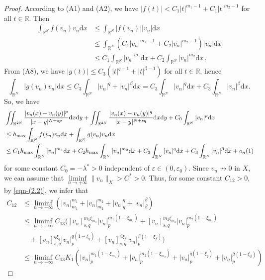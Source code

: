 \documentclass[reqno]{amsart}
\begin{document}
\begin{proof}
According to (A1) and (A2), we have 
$|f(t)|<C_1|t|^{m_1-1}+C_1|t|^{m_2-1}$ for all $t\in\mathbb{R}$. Then
\begin{align*}
\int_{\mathbb{R}^N}f(v_n)v_n\mathrm{d}x
&\le \int_{\mathbb{R}^N}|f(v_n)||v_n|\mathrm{d}x\\
&\le\int_{\mathbb{R}^N}(C_1|v_n|^{m_1-1}+C_2|v_n|^{m_2-1})|v_n|\mathrm{d}x\\
&\le C_1\int_{\mathbb{R}^N}|v_n|^{m_1}\mathrm{d}x
+C_2\int_{\mathbb{R}^N}|v_n|^{m_2}\mathrm{d}x\,.
\end{align*}
From (A8), we have $|g(t)|\le C_3(|t|^{q-1}+|t|^{\beta-1})$ for all $t\in\mathbb{R} $, 
hence
$$
\int_{\mathbb{R}^N}|g(v_n)v_n|\mathrm{d}x
 \le C_3\int_{\mathbb{R}^N}|v_n|^{q}+|v_n|^{\beta}\mathrm{d}x
 =C_3\int_{\mathbb{R}^N}|v_n|^{q}\mathrm{d}x
 +C_3\int_{\mathbb{R}^N}|v_n|^{\beta}\mathrm{d}x.
$$
So, we have
\begin{align*}
&\iint_{\mathbb{R}^{2N}}\frac{|v_n(x)-v_n(y)|^{p}}{|x-y|^{N+sp}}
 \mathrm{d}x\mathrm{d}y+\iint_{\mathbb{R}^{2N}}\frac{|v_n(x)
 -v_n(y)|^{q}}{|x-y|^{N+sq}}\mathrm{d}x\mathrm{d}y
 +C_0\int_{\mathbb{R}^N}| v_n|^{p}\mathrm{d}x\\
&\le h_{\rm max}\int_{\mathbb{R}^N}f(v_n)v_n\mathrm{d}x
 +\int_{\mathbb{R}^N}g(v_n)v_n\mathrm{d}x\\
&\le C_1h_{\rm max}\int_{\mathbb{R}^N}|v_n|^{m_1}\mathrm{d}x
 +C_2h_{\rm max}\int_{\mathbb{R}^N}|v_n|^{m_2}\mathrm{d}x
 +C_3\int_{\mathbb{R}^N}|v_n|^{q}\mathrm{d}x
 +C_3\int_{\mathbb{R}^N}|v_n|^{\beta}\mathrm{d}x+o_n(1)
\end{align*}
for some constant $C_0=-\lambda^{*}>0$ independent of 
$\varepsilon\in(0,\varepsilon_0)$. Since $v_n\not\to0$  in $X$, we can assume that
$\underset{n\to+\infty}\liminf \|v_n\|_X > C^{*} > 0$.
Thus, for some constant $C_{12}>0$, by \eqref{eqn-(2.2)}, we infer that
\begin{equation}\label{eqn-(3.12)}
\begin{aligned}
C_{12}
&\leq \underset{n\to+\infty}\liminf(|v_n|_{m_1}^{m_1}+|v_n|_{m_2}^{m_2}+|v_n|_{q}^{q}
 +|v_n|_{\beta}^{\beta})\\
&\le \underset{n\to+\infty}\liminf C_{13}([v_n]_{{s,q}}^{m_1\xi_{m_1}}
 |v_n|_{p}^{m_1(1-\xi_{m_1})}+[v_n]_{{s,q}}^{m_2\xi_{m_2}}|v_n|_{p}^{m_2(1-\xi_{m_2})}\\
&\quad +[v_n]_{{s,q}}^{q\xi_{q}}|v_n|_{p}^{q(1-\xi_{q})}
 +[v_n]_{{s,q}}^{\beta\xi_{\beta}}|v_n|_{p}^{\beta(1-\xi_{\beta})})\\
&\leq  \liminf_{n\to+\infty}  C_{13}K_1(|v_n|_{p}^{m_1(1-\xi_{m_1})}
 +|v_n|_{p}^{m_2(1-\xi_{m_2})}+|v_n|_{p}^{q(1-\xi_{q})}+|v_n|_{p}^{\beta(1-\xi_{\beta})})

\end{aligned}
\end{equation}
\end{proof}
\end{document}
